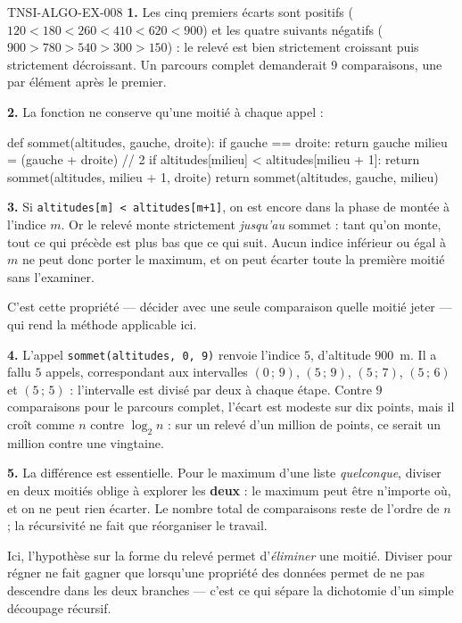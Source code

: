 \begin{corrige}{TNSI-ALGO-EX-008}
\textbf{1.} Les cinq premiers écarts sont positifs
($120<180<260<410<620<900$) et les quatre suivants négatifs
($900>780>540>300>150$) : le relevé est bien strictement croissant puis
strictement décroissant. Un parcours complet demanderait $9$ comparaisons, une
par élément après le premier.

\textbf{2.} La fonction ne conserve qu'une moitié à chaque appel :
\begin{python}
def sommet(altitudes, gauche, droite):
    if gauche == droite:
        return gauche
    milieu = (gauche + droite) // 2
    if altitudes[milieu] < altitudes[milieu + 1]:
        return sommet(altitudes, milieu + 1, droite)
    return sommet(altitudes, gauche, milieu)
\end{python}

\textbf{3.} Si \lstinline{altitudes[m] < altitudes[m+1]}, on est encore dans la
phase de montée à l'indice $m$. Or le relevé monte strictement \emph{jusqu'au}
sommet : tant qu'on monte, tout ce qui précède est plus bas que ce qui suit.
Aucun indice inférieur ou égal à $m$ ne peut donc porter le maximum, et on peut
écarter toute la première moitié sans l'examiner.

C'est cette propriété — décider avec une seule comparaison quelle moitié jeter —
qui rend la méthode applicable ici.

\textbf{4.} L'appel \lstinline{sommet(altitudes, 0, 9)} renvoie l'indice $5$,
d'altitude $900$~m. Il a fallu $5$ appels, correspondant aux intervalles
$(0\,;\,9)$, $(5\,;\,9)$, $(5\,;\,7)$, $(5\,;\,6)$ et $(5\,;\,5)$ : l'intervalle
est divisé par deux à chaque étape. Contre $9$ comparaisons pour le parcours
complet, l'écart est modeste sur dix points, mais il croît comme $n$ contre
$\log_2 n$ : sur un relevé d'un million de points, ce serait un million contre
une vingtaine.

\textbf{5.} La différence est essentielle. Pour le maximum d'une liste
\emph{quelconque}, diviser en deux moitiés oblige à explorer les \textbf{deux} :
le maximum peut être n'importe où, et on ne peut rien écarter. Le nombre total de
comparaisons reste de l'ordre de $n$ ; la récursivité ne fait que réorganiser le
travail.

Ici, l'hypothèse sur la forme du relevé permet d'\emph{éliminer} une moitié.
Diviser pour régner ne fait gagner que lorsqu'une propriété des données permet de
ne pas descendre dans les deux branches — c'est ce qui sépare la dichotomie d'un
simple découpage récursif.


\end{corrige}
